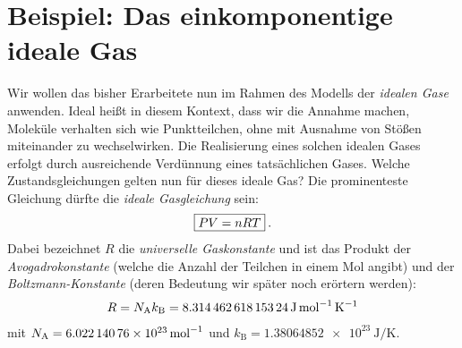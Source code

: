 \section{Beispiel: Das einkomponentige ideale Gas}
Wir wollen das bisher Erarbeitete nun im Rahmen des Modells der \emph{idealen Gase} anwenden. Ideal heißt in diesem Kontext, dass wir die Annahme machen, Moleküle verhalten sich wie Punktteilchen, ohne \textendash{} mit Ausnahme von Stößen \textendash{} miteinander zu wechselwirken. Die Realisierung eines solchen idealen Gases erfolgt durch ausreichende Verdünnung eines tatsächlichen Gases.
Welche Zustandsgleichungen gelten nun für dieses ideale Gas?
Die prominenteste Gleichung dürfte die \emph{ideale Gasgleichung} sein:
\begin{align}
    \label{eq:ideale gasgleichung}
    \boxed{PV=n RT}\:.
\end{align}
Dabei bezeichnet $R$ die \emph{universelle Gaskonstante} und ist das Produkt der \emph{Avogadrokonstante} (welche die Anzahl der Teilchen in einem Mol angibt) und der \emph{Boltzmann-Konstante} (deren Bedeutung wir später noch erörtern werden):
\begin{align*}
    R=N_\mathrm{A} k_\mathrm{B}=\qty{ 8,314 462 618 153 24}{\joule\per\mole\per\kelvin}
\end{align*}
mit $N_\mathrm{A}=\qty{6,02214076e23}{\per\mole}$ und $k_\mathrm{B}=\qty{1,38064852e23}{\joule\per\kelvin}$. 

